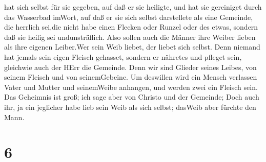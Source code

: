 hat sich selbst für sie gegeben,  auf daß er sie heiligte,
und hat sie gereiniget durch das Wasserbad imWort,  auf daß
er sie sich selbst darstellete als eine Gemeinde, die herrlich sei,die
nicht habe einen Flecken oder Runzel oder des etwas, sondern daß sie
heilig sei undunsträflich.  Also sollen auch die Männer
ihre Weiber lieben als ihre eigenen Leiber.Wer sein Weib liebet, der
liebet sich selbst.  Denn niemand hat jemals sein eigen
Fleisch gehasset, sondern er nähretes und pfleget sein, gleichwie auch
der HErr die Gemeinde.  Denn wir sind Glieder seines
Leibes, von seinem Fleisch und von seinemGebeine.  Um
deswillen wird ein Mensch verlassen Vater und Mutter und seinemWeibe
anhangen, und werden zwei ein Fleisch sein.  Das Geheimnis
ist groß; ich sage aber von Christo und der Gemeinde;  Doch
auch ihr, ja ein jeglicher habe lieb sein Weib als sich selbst; dasWeib
aber fürchte den Mann.

\hypertarget{section-5}{%
\section{6}\label{section-5}}

